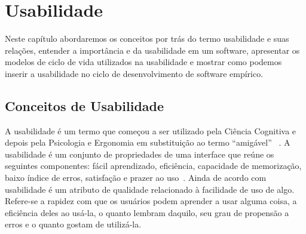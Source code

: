 \chapter{Usabilidade}

Neste capítulo abordaremos os conceitos por trás do termo usabilidade e suas  relações, entender a importância e da usabilidade em um software, apresentar os modelos de ciclo de vida utilizados na usabilidade e mostrar como podemos inserir a usabilidade no ciclo de desenvolvimento de software empírico.

\section{Conceitos de Usabilidade}

A usabilidade é um termo que começou a ser utilizado pela Ciência Cognitiva e depois pela Psicologia e Ergonomia em substituição ao termo ``amigável'' ~\cite{dias2006}.
% 
A usabilidade é um conjunto de propriedades de uma interface que reúne os seguintes componentes: fácil aprendizado, eficiência, capacidade de memorização, baixo índice de erros, satisfação e prazer ao uso~\cite{nielsen1994}.
%
Ainda de acordo com  usabilidade é um atributo de qualidade relacionado à facilidade de uso de algo. Refere-se a rapidez com que os usuários podem aprender a usar alguma coisa, a eficiência deles ao usá-la, o quanto lembram daquilo, seu grau de propensão a erros e o quanto gostam de utilizá-la. 
%

